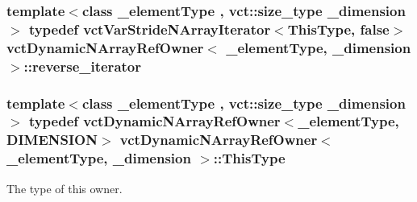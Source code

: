 \hypertarget{classvct_dynamic_n_array_ref_owner_aabd87b1efc3a18043c6dac3d8017be59}{
\subsubsection[{reverse\-\_\-iterator}]{\setlength{\rightskip}{0pt plus 5cm}template$<$class \-\_\-element\-Type , vct\-::size\-\_\-type \-\_\-dimension$>$ typedef {\bf vct\-Var\-Stride\-N\-Array\-Iterator}$<${\bf This\-Type}, false$>$ {\bf vct\-Dynamic\-N\-Array\-Ref\-Owner}$<$ \-\_\-element\-Type, \-\_\-dimension $>$\-::{\bf reverse\-\_\-iterator}}}\label{classvct_dynamic_n_array_ref_owner_aabd87b1efc3a18043c6dac3d8017be59}
\hypertarget{classvct_dynamic_n_array_ref_owner_acd225aa6d3759b053ed4ab7ca6026989}{
\subsubsection[{This\-Type}]{\setlength{\rightskip}{0pt plus 5cm}template$<$class \-\_\-element\-Type , vct\-::size\-\_\-type \-\_\-dimension$>$ typedef {\bf vct\-Dynamic\-N\-Array\-Ref\-Owner}$<$\-\_\-element\-Type, {\bf D\-I\-M\-E\-N\-S\-I\-O\-N}$>$ {\bf vct\-Dynamic\-N\-Array\-Ref\-Owner}$<$ \-\_\-element\-Type, \-\_\-dimension $>$\-::{\bf This\-Type}}}\label{classvct_dynamic_n_array_ref_owner_acd225aa6d3759b053ed4ab7ca6026989}
The type of this owner. 

